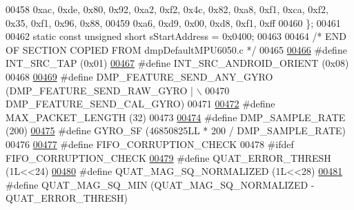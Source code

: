 \begin{DoxyCode}
00458     0xac, 0xde, 0x80, 0x92, 0xa2, 0xf2, 0x4c, 0x82, 0xa8, 0xf1, 0xca, 0xf2, 0x35, 0xf1, 0x96, 0x88,
00459     0xa6, 0xd9, 0x00, 0xd8, 0xf1, 0xff
00460 \};
00461 
00462 \textcolor{keyword}{static} \textcolor{keyword}{const} \textcolor{keywordtype}{unsigned} \textcolor{keywordtype}{short} sStartAddress = 0x0400;
00463 
00464 \textcolor{comment}{/* END OF SECTION COPIED FROM dmpDefaultMPU6050.c */}
00465 
\hypertarget{inv__mpu__dmp__motion__driver_8c_source.tex_l00466}{}\hyperlink{group___d_r_i_v_e_r_s_gac5690dcf21f75f38bc3ea13ad4799714}{00466} \textcolor{preprocessor}{#define INT\_SRC\_TAP             (0x01)}
\hypertarget{inv__mpu__dmp__motion__driver_8c_source.tex_l00467}{}\hyperlink{group___d_r_i_v_e_r_s_ga7c3f4a57d404a1321ce6dfc00e33ac4d}{00467} \textcolor{preprocessor}{#define INT\_SRC\_ANDROID\_ORIENT  (0x08)}
00468 
\hypertarget{inv__mpu__dmp__motion__driver_8c_source.tex_l00469}{}\hyperlink{group___d_r_i_v_e_r_s_gadda8f4118bd084cfb4fcda3571585c56}{00469} \textcolor{preprocessor}{#define DMP\_FEATURE\_SEND\_ANY\_GYRO   (DMP\_FEATURE\_SEND\_RAW\_GYRO | \(\backslash\)}
00470 \textcolor{preprocessor}{                                     DMP\_FEATURE\_SEND\_CAL\_GYRO)}
00471 
\hypertarget{inv__mpu__dmp__motion__driver_8c_source.tex_l00472}{}\hyperlink{group___d_r_i_v_e_r_s_ga973c680573b37fc359fc68d0707da355}{00472} \textcolor{preprocessor}{#define MAX\_PACKET\_LENGTH   (32)}
00473 
\hypertarget{inv__mpu__dmp__motion__driver_8c_source.tex_l00474}{}\hyperlink{group___d_r_i_v_e_r_s_ga9d0f0425cbcb58186500cb8686e41e67}{00474} \textcolor{preprocessor}{#define DMP\_SAMPLE\_RATE     (200)}
\hypertarget{inv__mpu__dmp__motion__driver_8c_source.tex_l00475}{}\hyperlink{group___d_r_i_v_e_r_s_gac0325c658f2911bdfc3b44fca31c684f}{00475} \textcolor{preprocessor}{#define GYRO\_SF             (46850825LL * 200 / DMP\_SAMPLE\_RATE)}
00476 
\hypertarget{inv__mpu__dmp__motion__driver_8c_source.tex_l00477}{}\hyperlink{group___d_r_i_v_e_r_s_gabb3bcb4d19c847aa89a356478b7da027}{00477} \textcolor{preprocessor}{#define FIFO\_CORRUPTION\_CHECK}
00478 \textcolor{preprocessor}{#ifdef FIFO\_CORRUPTION\_CHECK}
\hypertarget{inv__mpu__dmp__motion__driver_8c_source.tex_l00479}{}\hyperlink{group___d_r_i_v_e_r_s_ga633dcbd524d41e6f76c0fda39828c8e1}{00479} \textcolor{preprocessor}{#define QUAT\_ERROR\_THRESH       (1L<<24)}
\hypertarget{inv__mpu__dmp__motion__driver_8c_source.tex_l00480}{}\hyperlink{group___d_r_i_v_e_r_s_ga290880f86641e11d62db9792eab808bd}{00480} \textcolor{preprocessor}{#define QUAT\_MAG\_SQ\_NORMALIZED  (1L<<28)}
\hypertarget{inv__mpu__dmp__motion__driver_8c_source.tex_l00481}{}\hyperlink{group___d_r_i_v_e_r_s_gae76871da254b93d8b944ec65792db252}{00481} \textcolor{preprocessor}{#define QUAT\_MAG\_SQ\_MIN         (QUAT\_MAG\_SQ\_NORMALIZED - QUAT\_ERROR\_THRESH)}

\end{DoxyCode}

